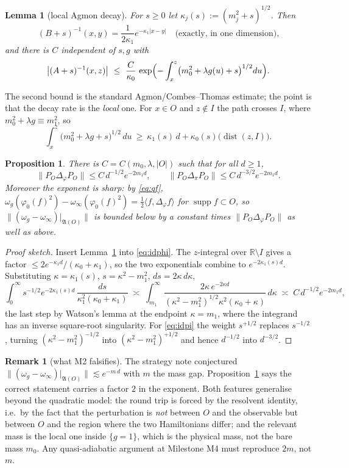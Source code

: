 \documentclass[11pt,a4paper]{article}
\theoremstyle{plain}
\newtheorem{proposition}[theorem]{Proposition}
\newtheorem{lemma}[theorem]{Lemma}
\theoremstyle{definition}
\newtheorem{remark}[theorem]{Remark}
\newcommand{\A}{\mathfrak{A}}
\newcommand{\R}{\mathbb{R}}
\newcommand{\ip}[2]{\langle #1,#2\rangle}
\DeclareMathOperator{\dist}{dist}
\DeclareMathOperator{\supp}{supp}
\begin{document}
\begin{lemma}[local Agmon decay]\label{lem:agmon}
For $s\ge0$ let $\kappa_j(s):=(m_j^2+s)^{1/2}$. Then
\[
  (B+s)^{-1}(x,y)=\frac{1}{2\kappa_1}e^{-\kappa_1|x-y|}\quad\text{(exactly, in one dimension),}
\]
and there is $C$ independent of $s,g$ with
\[
  \bigl|(A+s)^{-1}(x,z)\bigr|\ \le\ \frac{C}{\kappa_0}\,
  \exp\Bigl(-\int_x^z\bigl(m_0^2+\lambda g(u)+s\bigr)^{1/2}du\Bigr).
\]
\end{lemma}

The second bound is the standard Agmon/Combes--Thomas estimate; the point is that the decay rate
is the \emph{local} one. For $x\in O$ and $z\notin I$ the path crosses $I$, where
$m_0^2+\lambda g\equiv m_1^2$, so
\[
  \int_x^z\bigl(m_0^2+\lambda g+s\bigr)^{1/2}\,du\ \ge\ \kappa_1(s)\,d+\kappa_0(s)\bigl(\dist(z,I)\bigr).
\]

\begin{proposition}\label{prop:rate}
There is $C=C(m_0,\lambda,|O|)$ such that for all $d\ge1$,
\[
  \bigl\|P_O\Delta_\varphi P_O\bigr\|\le C\,d^{-1/2}e^{-2m_1d},
  \qquad
  \bigl\|P_O\Delta_\pi P_O\bigr\|\le C\,d^{-3/2}e^{-2m_1d} .
\]
Moreover the exponent is \emph{sharp}: by \eqref{eq:qf},
$\omega_g(\varphi_0(f)^2)-\omega_\infty(\varphi_0(f)^2)=\tfrac12\ip{f}{\Delta_\varphi f}$ for
$\supp f\subset O$, so $\|(\omega_g-\omega_\infty)|_{\A(O)}\|$ is bounded below by a constant
times $\|P_O\Delta_\varphi P_O\|$ as well as above.
\end{proposition}

\begin{proof}[Proof sketch]
Insert Lemma~\ref{lem:agmon} into \eqref{eq:idphi}. The $z$-integral over $\R\setminus I$ gives a
factor $\le 2e^{-\kappa_1 d}/(\kappa_0+\kappa_1)$, so the two exponentials combine to
$e^{-2\kappa_1(s)d}$. Substituting $\kappa=\kappa_1(s)$, $s=\kappa^2-m_1^2$, $ds=2\kappa\,d\kappa$,
\[
  \int_0^\infty s^{-1/2}e^{-2\kappa_1(s)d}\,\frac{ds}{\kappa_1^2(\kappa_0+\kappa_1)}
  \;\asymp\;\int_{m_1}^\infty\frac{2\kappa\,e^{-2\kappa d}}{(\kappa^2-m_1^2)^{1/2}\kappa^2(\kappa_0+\kappa)}\,d\kappa
  \;\asymp\;C\,d^{-1/2}e^{-2m_1d},
\]
the last step by Watson's lemma at the endpoint $\kappa=m_1$, where the integrand has an inverse
square-root singularity. For \eqref{eq:idpi} the weight $s^{+1/2}$ replaces $s^{-1/2}$, turning
$(\kappa^2-m_1^2)^{-1/2}$ into $(\kappa^2-m_1^2)^{+1/2}$ and hence $d^{-1/2}$ into $d^{-3/2}$.
\end{proof}

\begin{remark}[what M2 falsifies]
The strategy note conjectured $\|(\omega_g-\omega_\infty)|_{\A(O)}\|\lesssim e^{-m\,d}$ with $m$
the mass gap. Proposition~\ref{prop:rate} says the correct statement carries a factor $2$ in the
exponent. Both features generalise beyond the quadratic model: the round trip is forced by the
resolvent identity, i.e.\ by the fact that the perturbation is \emph{not} between $O$ and the
observable but between $O$ and the region where the two Hamiltonians differ; and the relevant
mass is the local one inside $\{g=1\}$, which is the physical mass, not the bare mass $m_0$.
Any quasi-adiabatic argument at Milestone M4 must reproduce $2m$, not $m$.
\end{remark}
\end{document}
